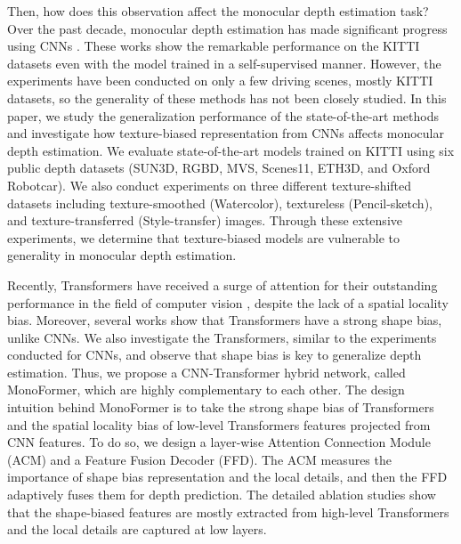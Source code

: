 \documentclass[letterpaper]{article} \usepackage{aaai23}  \usepackage{times}  \usepackage{helvet}  \usepackage{courier}  \usepackage[hyphens]{url}  \usepackage{graphicx} \urlstyle{rm} \def\UrlFont{\rm}  \usepackage{natbib}  \usepackage{caption} \frenchspacing  \setlength{\pdfpagewidth}{8.5in} \setlength{\pdfpageheight}{11in} \usepackage{algorithm}
\begin{document}
Then, how does this observation affect the monocular depth estimation task? Over the past decade, monocular depth estimation has made significant progress using CNNs \cite{xiong2021self,yin2018geonet,zhou2021r,godard2019digging,guizilini20203d,casser2019depth}. 
These works show the remarkable performance on the KITTI datasets \cite{Geiger2013IJRR} even with the model trained in a self-supervised manner.
However, the experiments have been conducted on only a few driving scenes, mostly KITTI datasets, so the generality of these methods has not been closely studied.
In this paper, we study the generalization performance of the state-of-the-art methods and investigate how texture-biased representation from CNNs affects monocular depth estimation.
We evaluate state-of-the-art models trained on KITTI using six public depth datasets (SUN3D, RGBD, MVS, Scenes11, ETH3D, and Oxford Robotcar).
We also conduct experiments on three different texture-shifted datasets including texture-smoothed (Watercolor), textureless (Pencil-sketch), and texture-transferred (Style-transfer) images.
Through these extensive experiments, we determine that texture-biased models are vulnerable to generality in monocular depth estimation.

Recently, Transformers \cite{dosovitskiy2020image} have received a surge of attention for their outstanding performance in the field of computer vision \cite{carion2020end}, despite the lack of a spatial locality bias. 
Moreover, several works \cite{zhang2021delving,morrison2021exploring,park2022vision} show that Transformers have a strong shape bias, unlike CNNs. 
We also investigate the Transformers, similar to the experiments conducted for CNNs, and observe that shape bias is key to generalize depth estimation.
Thus, we propose a CNN-Transformer hybrid network, called MonoFormer, which are highly complementary to each other. 
The design intuition behind MonoFormer is to take the strong shape bias of Transformers and the spatial locality bias of low-level Transformers features projected from CNN features. 
To do so, we design a layer-wise Attention Connection Module (ACM) and a Feature Fusion Decoder (FFD). The ACM measures the importance of shape bias representation and the local details, and then the FFD adaptively fuses them for depth prediction.
The detailed ablation studies show that the shape-biased features are mostly extracted from high-level Transformers and the local details are captured at low layers. 
\end{document}
